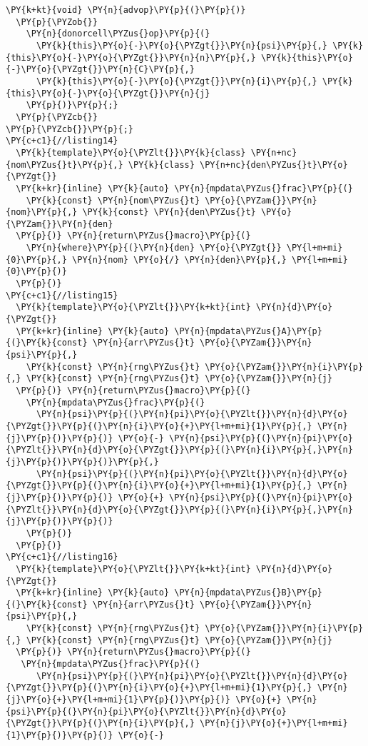 \begin{Verbatim}[commandchars=\\\{\}]
  \PY{k+kt}{void} \PY{n}{advop}\PY{p}{(}\PY{p}{)}
  \PY{p}{\PYZob{}}
    \PY{n}{donorcell\PYZus{}op}\PY{p}{(}
      \PY{k}{this}\PY{o}{-}\PY{o}{\PYZgt{}}\PY{n}{psi}\PY{p}{,} \PY{k}{this}\PY{o}{-}\PY{o}{\PYZgt{}}\PY{n}{n}\PY{p}{,} \PY{k}{this}\PY{o}{-}\PY{o}{\PYZgt{}}\PY{n}{C}\PY{p}{,} 
      \PY{k}{this}\PY{o}{-}\PY{o}{\PYZgt{}}\PY{n}{i}\PY{p}{,} \PY{k}{this}\PY{o}{-}\PY{o}{\PYZgt{}}\PY{n}{j}
    \PY{p}{)}\PY{p}{;}
  \PY{p}{\PYZcb{}}
\PY{p}{\PYZcb{}}\PY{p}{;}
\PY{c+c1}{//listing14}
  \PY{k}{template}\PY{o}{\PYZlt{}}\PY{k}{class} \PY{n+nc}{nom\PYZus{}t}\PY{p}{,} \PY{k}{class} \PY{n+nc}{den\PYZus{}t}\PY{o}{\PYZgt{}}
  \PY{k+kr}{inline} \PY{k}{auto} \PY{n}{mpdata\PYZus{}frac}\PY{p}{(}
    \PY{k}{const} \PY{n}{nom\PYZus{}t} \PY{o}{\PYZam{}}\PY{n}{nom}\PY{p}{,} \PY{k}{const} \PY{n}{den\PYZus{}t} \PY{o}{\PYZam{}}\PY{n}{den}
  \PY{p}{)} \PY{n}{return\PYZus{}macro}\PY{p}{(}
    \PY{n}{where}\PY{p}{(}\PY{n}{den} \PY{o}{\PYZgt{}} \PY{l+m+mi}{0}\PY{p}{,} \PY{n}{nom} \PY{o}{/} \PY{n}{den}\PY{p}{,} \PY{l+m+mi}{0}\PY{p}{)}
  \PY{p}{)} 
\PY{c+c1}{//listing15}
  \PY{k}{template}\PY{o}{\PYZlt{}}\PY{k+kt}{int} \PY{n}{d}\PY{o}{\PYZgt{}}
  \PY{k+kr}{inline} \PY{k}{auto} \PY{n}{mpdata\PYZus{}A}\PY{p}{(}\PY{k}{const} \PY{n}{arr\PYZus{}t} \PY{o}{\PYZam{}}\PY{n}{psi}\PY{p}{,} 
    \PY{k}{const} \PY{n}{rng\PYZus{}t} \PY{o}{\PYZam{}}\PY{n}{i}\PY{p}{,} \PY{k}{const} \PY{n}{rng\PYZus{}t} \PY{o}{\PYZam{}}\PY{n}{j}
  \PY{p}{)} \PY{n}{return\PYZus{}macro}\PY{p}{(}
    \PY{n}{mpdata\PYZus{}frac}\PY{p}{(}
      \PY{n}{psi}\PY{p}{(}\PY{n}{pi}\PY{o}{\PYZlt{}}\PY{n}{d}\PY{o}{\PYZgt{}}\PY{p}{(}\PY{n}{i}\PY{o}{+}\PY{l+m+mi}{1}\PY{p}{,} \PY{n}{j}\PY{p}{)}\PY{p}{)} \PY{o}{-} \PY{n}{psi}\PY{p}{(}\PY{n}{pi}\PY{o}{\PYZlt{}}\PY{n}{d}\PY{o}{\PYZgt{}}\PY{p}{(}\PY{n}{i}\PY{p}{,}\PY{n}{j}\PY{p}{)}\PY{p}{)}\PY{p}{,}
      \PY{n}{psi}\PY{p}{(}\PY{n}{pi}\PY{o}{\PYZlt{}}\PY{n}{d}\PY{o}{\PYZgt{}}\PY{p}{(}\PY{n}{i}\PY{o}{+}\PY{l+m+mi}{1}\PY{p}{,} \PY{n}{j}\PY{p}{)}\PY{p}{)} \PY{o}{+} \PY{n}{psi}\PY{p}{(}\PY{n}{pi}\PY{o}{\PYZlt{}}\PY{n}{d}\PY{o}{\PYZgt{}}\PY{p}{(}\PY{n}{i}\PY{p}{,}\PY{n}{j}\PY{p}{)}\PY{p}{)}
    \PY{p}{)} 
  \PY{p}{)} 
\PY{c+c1}{//listing16}
  \PY{k}{template}\PY{o}{\PYZlt{}}\PY{k+kt}{int} \PY{n}{d}\PY{o}{\PYZgt{}}
  \PY{k+kr}{inline} \PY{k}{auto} \PY{n}{mpdata\PYZus{}B}\PY{p}{(}\PY{k}{const} \PY{n}{arr\PYZus{}t} \PY{o}{\PYZam{}}\PY{n}{psi}\PY{p}{,} 
    \PY{k}{const} \PY{n}{rng\PYZus{}t} \PY{o}{\PYZam{}}\PY{n}{i}\PY{p}{,} \PY{k}{const} \PY{n}{rng\PYZus{}t} \PY{o}{\PYZam{}}\PY{n}{j}
  \PY{p}{)} \PY{n}{return\PYZus{}macro}\PY{p}{(}
   \PY{n}{mpdata\PYZus{}frac}\PY{p}{(}
      \PY{n}{psi}\PY{p}{(}\PY{n}{pi}\PY{o}{\PYZlt{}}\PY{n}{d}\PY{o}{\PYZgt{}}\PY{p}{(}\PY{n}{i}\PY{o}{+}\PY{l+m+mi}{1}\PY{p}{,} \PY{n}{j}\PY{o}{+}\PY{l+m+mi}{1}\PY{p}{)}\PY{p}{)} \PY{o}{+} \PY{n}{psi}\PY{p}{(}\PY{n}{pi}\PY{o}{\PYZlt{}}\PY{n}{d}\PY{o}{\PYZgt{}}\PY{p}{(}\PY{n}{i}\PY{p}{,} \PY{n}{j}\PY{o}{+}\PY{l+m+mi}{1}\PY{p}{)}\PY{p}{)} \PY{o}{-}

\end{Verbatim}
